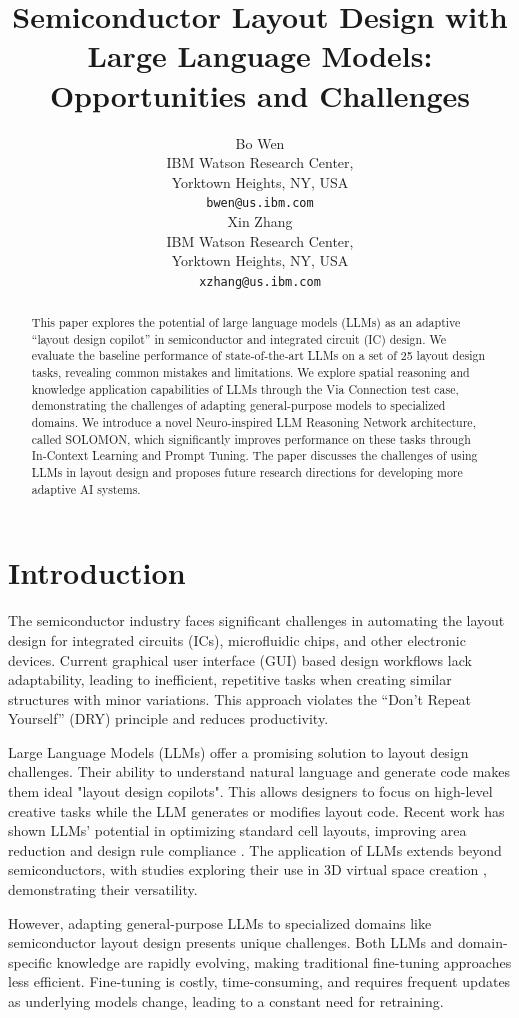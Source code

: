 \documentclass{article}
\title{Semiconductor Layout Design with Large Language Models: Opportunities and Challenges}
\author{%
  Bo Wen\\
  IBM Watson Research Center, \\
  Yorktown Heights, NY, USA \\
  \texttt{bwen@us.ibm.com} \\
  \And
  Xin Zhang\\
  IBM Watson Research Center, \\
  Yorktown Heights, NY, USA \\
  \texttt{xzhang@us.ibm.com} \\
}
\begin{document}
\maketitle

\begin{abstract}
  This paper explores the potential of large language models (LLMs) as an adaptive ``layout design copilot'' in semiconductor and integrated circuit (IC) design. We evaluate the baseline performance of state-of-the-art LLMs on a set of 25 layout design tasks, revealing common mistakes and limitations. We explore spatial reasoning and knowledge application capabilities of LLMs through the Via Connection test case, demonstrating the challenges of adapting general-purpose models to specialized domains. We introduce a novel Neuro-inspired LLM Reasoning Network architecture, called SOLOMON, which significantly improves performance on these tasks through In-Context Learning and Prompt Tuning. The paper discusses the challenges of using LLMs in layout design and proposes future research directions for developing more adaptive AI systems.
\end{abstract}

\section{Introduction}
The semiconductor industry faces significant challenges in automating the layout design for integrated circuits (ICs), microfluidic chips, and other electronic devices. Current graphical user interface (GUI) based design workflows lack adaptability, leading to inefficient, repetitive tasks when creating similar structures with minor variations.\cite{Greengard2024-hx} This approach violates the ``Don't Repeat Yourself'' (DRY) principle and reduces productivity.

Large Language Models (LLMs) offer a promising solution to layout design challenges. Their ability to understand natural language and generate code makes them ideal "layout design copilots". This allows designers to focus on high-level creative tasks while the LLM generates or modifies layout code. Recent work has shown LLMs' potential in optimizing standard cell layouts, improving area reduction and design rule compliance \cite{Ho2024-cd}. The application of LLMs extends beyond semiconductors, with studies exploring their use in 3D virtual space creation \cite{Sasazawa2024-wf}, demonstrating their versatility.

However, adapting general-purpose LLMs to specialized domains like semiconductor layout design presents unique challenges. Both LLMs and domain-specific knowledge are rapidly evolving, making traditional fine-tuning approaches less efficient. Fine-tuning is costly, time-consuming, and requires frequent updates as underlying models change, leading to a constant need for retraining.
\end{document}

